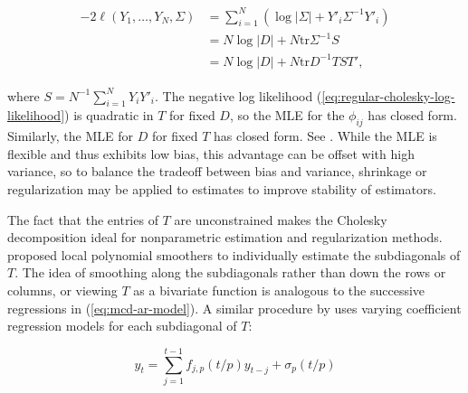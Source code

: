 \begin{align}
\begin{split} \label{eq:regular-cholesky-log-likelihood}
-2\ell\left(Y_1,\dots, Y_N, \Sigma\right) &= \sum_{i = 1}^N \left( \log \vert \Sigma \vert  + Y'_i \Sigma^{-1}Y'_i\right) \\
&= N \log \vert D \vert + N \mbox{tr}\Sigma^{-1}S \\
& = N \log \vert D \vert + N \mbox{tr}D^{-1}TST', 
\end{split}
\end{align}

\noindent
where $S = N^{-1}\sum_{i=1}^N Y_iY'_i$. The negative log likelihood (\ref{eq:regular-cholesky-log-likelihood}) is quadratic in $T$ for fixed $D$, so the MLE for the $\phi_{ij}$ has closed form. Similarly, the MLE for $D$ for fixed $T$ has closed form. See \cite{pourahmadi2000maximum}.  While the MLE is flexible and thus exhibits low bias, this advantage can be offset with high variance, so to balance the tradeoff between bias and variance, shrinkage or regularization may be applied to estimates to improve stability of estimators.  

\bigskip

The fact that the entries of $T$ are unconstrained makes the Cholesky decomposition ideal for nonparametric estimation and regularization methods. \cite{wu2003nonparametric} proposed local polynomial smoothers to individually estimate the subdiagonals of $T$. The idea of smoothing along the subdiagonals rather than down the rows or columns, or viewing $T$ as a bivariate function is analogous to the successive regressions in (\ref{eq:mcd-ar-model}). A similar procedure by \cite{dahlhaus1997fitting} uses varying coefficient regression models for each subdiagonal of $T$:

\[
y_t = \sum_{j = 1}^{t-1} f_{j,p}\left( t/p \right) y_{t-j} + \sigma_p\left(t/p\right)
\]

